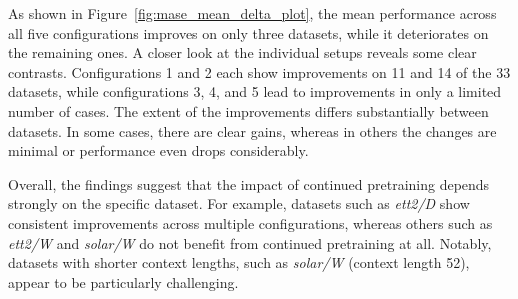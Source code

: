 As shown in Figure~\ref{fig:mase_mean_delta_plot}, the mean performance across all five configurations improves on only three datasets, while it deteriorates on the remaining ones.
A closer look at the individual setups reveals some clear contrasts.
Configurations 1 and 2 each show improvements on 11 and 14 of the 33 datasets, while configurations 3, 4, and 5 lead to improvements in only a limited number of cases.
The extent of the improvements differs substantially between datasets.
In some cases, there are clear gains, whereas in others the changes are minimal or performance even drops considerably.

Overall, the findings suggest that the impact of continued pretraining depends strongly on the specific dataset.
For example, datasets such as \textit{ett2/D} show consistent improvements across multiple configurations, whereas others such as \textit{ett2/W} and \textit{solar/W} do not benefit from continued pretraining at all.
Notably, datasets with shorter context lengths, such as \textit{solar/W} (context length 52), appear to be particularly challenging.

